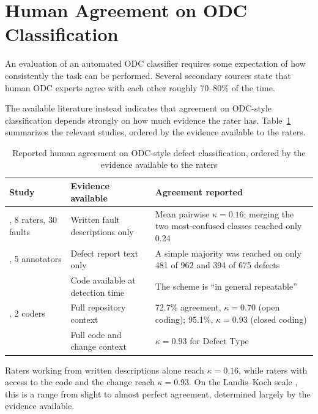 \documentclass{iutbscthesis}
\begin{document}
\section{Human Agreement on ODC Classification} \label{sec:human_agreement}

An evaluation of an automated ODC classifier requires some expectation of how consistently the task can be performed. Several secondary sources state that human ODC experts agree with each other roughly 70--80\% of the time.

The available literature instead indicates that agreement on ODC-style classification depends strongly on how much evidence the rater has. Table~\ref{tab:human_agreement} summarizes the relevant studies, ordered by the evidence available to the raters.

\begin{table}[!htbp]
    \centering
    \small
    \begin{tabular}{p{3.6cm} p{3.4cm} p{5.6cm}}
        \toprule
        \textbf{Study} & \textbf{Evidence available} & \textbf{Agreement reported} \\
        \midrule
        \textcite{henningsson2004assuring}, 8 raters, 30 faults & Written fault descriptions only & Mean pairwise $\kappa = 0.16$; merging the two most-confused classes reached only 0.24 \\
        \midrule
        \textcite{hernandez2018crowds}, 5 annotators & Defect report text only & A simple majority was reached on only 481 of 962 and 394 of 675 defects \\
        \midrule
        \textcite{elemam1998repeatability} & Code available at detection time & The scheme is ``in general repeatable'' \\
        \midrule
        \textcite{rahman2020covid}, 2 coders & Full repository context & 72.7\% agreement, $\kappa = 0.70$ (open coding); 95.1\%, $\kappa = 0.93$ (closed coding) \\
        \midrule
        \textcite{agnelo2020nosql} & Full code and change context & $\kappa = 0.93$ for Defect Type \\
        \bottomrule
    \end{tabular}
    \caption{Reported human agreement on ODC-style defect classification, ordered by the evidence available to the raters}
    \label{tab:human_agreement}
\end{table}

Raters working from written descriptions alone reach $\kappa = 0.16$, while raters with access to the code and the change reach $\kappa = 0.93$. On the Landis--Koch scale \cite{landis1977measurement}, this is a range from slight to almost perfect agreement, determined largely by the evidence available.
\end{document}
